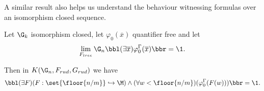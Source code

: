A similar result also helps us understand the behaviour witnessing formulas over an isomorphism closed sequence.

\begin{thrm}
Let $\G_k$ isomorphism closed, let $\varphi_0(\overline x)$ quantifier free and let 
\[\lim_{F_{tree}}\G_n\bbl(\exists \overline x)\varphi_0^\Gamma(\overline x)\bbr=\1.\]

Then in $K(\G_n,F_{rud},G_{rud})$ we have
\[\bbl(\exists F)(F:\set{\floor{n/m}}\hookrightarrow\M)\land(\forall w<\floor{n/m})(\varphi_0^\Gamma(F(w)))\bbr=\1.\]

\end{thrm}

